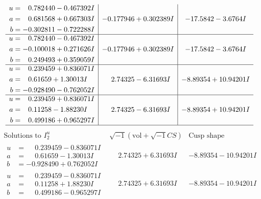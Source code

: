 \documentclass[1p]{elsarticle_modified}
\theoremstyle{definition}
\newcommand{\I}{\sqrt{-1}}
\begin{document}
$$\begin{array}{c|c|c}
\begin{aligned}
u &= \phantom{-}0.782440 - 0.467392 I \\
a &= \phantom{-}0.681568 + 0.667303 I \\
b &= -0.302811 - 0.722288 I\end{aligned}
 & -0.177946 + 0.302389 I & -17.5842 - 3.6764 I \\ \hline\begin{aligned}
u &= \phantom{-}0.782440 - 0.467392 I \\
a &= -0.100018 + 0.271626 I \\
b &= \phantom{-}0.249493 + 0.359059 I\end{aligned}
 & -0.177946 + 0.302389 I & -17.5842 - 3.6764 I \\ \hline\begin{aligned}
u &= \phantom{-}0.239459 + 0.836071 I \\
a &= \phantom{-}0.61659 + 1.30013 I \\
b &= -0.928490 - 0.762052 I\end{aligned}
 & \phantom{-}2.74325 - 6.31693 I & -8.89354 + 10.94201 I \\ \hline\begin{aligned}
u &= \phantom{-}0.239459 + 0.836071 I \\
a &= \phantom{-}0.11258 - 1.88230 I \\
b &= \phantom{-}0.499186 + 0.965297 I\end{aligned}
 & \phantom{-}2.74325 - 6.31693 I & -8.89354 + 10.94201 I\\
 \hline 
 \end{array}$$\newpage$$\begin{array}{c|c|c}  
\text{Solutions to }I^u_{2}& \I (\text{vol} + \sqrt{-1}CS) & \text{Cusp shape}\\
 \hline 
\begin{aligned}
u &= \phantom{-}0.239459 - 0.836071 I \\
a &= \phantom{-}0.61659 - 1.30013 I \\
b &= -0.928490 + 0.762052 I\end{aligned}
 & \phantom{-}2.74325 + 6.31693 I & -8.89354 - 10.94201 I \\ \hline\begin{aligned}
u &= \phantom{-}0.239459 - 0.836071 I \\
a &= \phantom{-}0.11258 + 1.88230 I \\
b &= \phantom{-}0.499186 - 0.965297 I\end{aligned}
 & \phantom{-}2.74325 + 6.31693 I & -8.89354 - 10.94201 I \\ \hline\begin{aligned}

\end{aligned}
\end{array}$$
\end{document}
